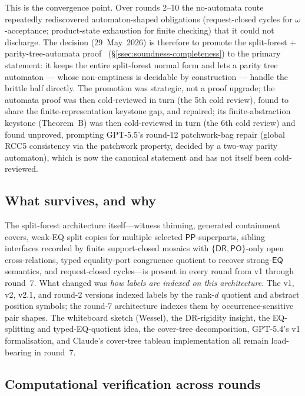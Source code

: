\documentclass[
]{ceurart}
\theoremstyle{definition}
\newcommand{\DR}{\ensuremath{\mathsf{DR}}}
\newcommand{\PO}{\ensuremath{\mathsf{PO}}}
\newcommand{\EQ}{\ensuremath{\mathsf{EQ}}}
\newcommand{\PP}{\ensuremath{\mathsf{PP}}}
\begin{document}
This is the convergence point.  Over rounds 2--10 the no-automata
route repeatedly rediscovered automaton-shaped obligations
(request-closed cycles for $\omega$-acceptance; product-state
exhaustion for finite checking) that it could not discharge.  The
decision (29~May~2026) is therefore to promote the split-forest
$+$ parity-tree-automata proof~\cite{GPT55AutomataRoute}
(\S\ref{ssec:soundness-completeness}) to the primary statement: it
keeps the entire split-forest normal form and lets a parity tree
automaton --- whose non-emptiness is decidable by construction ---
handle the brittle half directly.  The promotion was strategic, not a
proof upgrade; the automata proof was then cold-reviewed in turn (the
5th cold review), found to share the finite-representation keystone gap,
and repaired; its finite-abstraction keystone (Theorem~B) was then
cold-reviewed in turn (the 6th cold review) and found unproved,
prompting GPT-5.5's round-12 patchwork-bag repair (global RCC5
consistency via the patchwork property, decided by a two-way parity
automaton), which is now the canonical statement and has not itself
been cold-reviewed.

\subsection{What survives, and why}

The split-forest architecture itself---witness thinning,
generated containment covers, weak-EQ split copies for multiple
selected $\PP$-superparts, sibling interfaces recorded by
finite support-closed mosaics with $\{\DR,\PO\}$-only open
cross-relations, typed equality-port congruence quotient to
recover strong-$\EQ$ semantics, and request-closed cycles---is
present in every round from v1 through round~7.  What changed
was \emph{how labels are indexed on this architecture}.  The
v1, v2, v2.1, and round-2 versions indexed labels by the rank-$d$
quotient and abstract position symbols; the round-7 architecture
indexes them by occurrence-sensitive pair shapes.  The whiteboard
sketch (Wessel), the DR-rigidity insight, the EQ-splitting and
typed-EQ-quotient idea, the cover-tree decomposition, GPT-5.4's
v1 formalisation, and Claude's cover-tree tableau implementation
all remain load-bearing in round~7.

\subsection{Computational verification across rounds}
\label{ssec:compverif}
\end{document}
